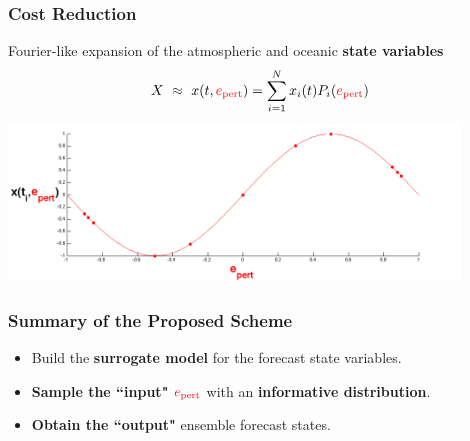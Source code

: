 \documentclass[graphics]{beamer}
\begin{document}
\begin{frame} %
   \frametitle{Cost Reduction}%
   Fourier-like expansion of the atmospheric and oceanic {\bf state variables}
   \begin{equation*}
      X \ \approx \ x(t,{\color{red} e_{\text{pert}}}) = \sum\limits_{i=1}^N x_i(t) P_i({\color{red} e_{\text{pert}}})
   \end{equation*}
   \includegraphics[width=0.9\textwidth, height=0.45\textwidth]{pce} 
\end{frame}

\begin{frame}
   \frametitle{Summary of the Proposed Scheme}%
	\begin{itemize}
	   \item Build the {\bf surrogate model} for the forecast state variables. %
		\vspace{12pt}
	   \item {\bf Sample the ``input"} ${\color{red} e_{\text{pert}}}$ with an {\bf informative distribution}.
		\vspace{12pt}
	   \item {\bf Obtain the ``output"} ensemble forecast states.
	\end{itemize}
\end{frame}
\end{document}
